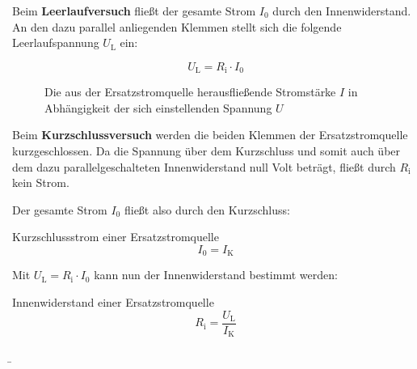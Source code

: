 \begin{frame}
{		Beim \textbf{Leerlaufversuch} fließt der gesamte Strom $I_0$ durch den Innenwiderstand. An den dazu parallel anliegenden
		Klemmen stellt sich die folgende Leerlaufspannung $U_\mathrm{L}$ ein:

		\begin{equation*}
			U_\mathrm{L} = R_\mathrm{i} \cdot I_0
		\end{equation*}


		\begin{figure}[ht]
			\centering


			\caption{Die aus der Ersatzstromquelle herausfließende Stromstärke $I$ in Abhängigkeit der sich einstellenden Spannung $U$}
			\label{fig:kennliniestrom}
		\end{figure}



		Beim \textbf{Kurzschlussversuch} werden die beiden Klemmen der Ersatzstromquelle kurzgeschlossen.
		Da die Spannung über dem Kurzschluss und somit
		auch über dem dazu parallelgeschalteten Innenwiderstand null Volt beträgt, fließt durch
		$R_\mathrm{i}$ kein Strom.

		Der gesamte Strom $I_0$ fließt also durch den Kurzschluss:



		\begin{Merksatz}{Kurzschlussstrom einer Ersatzstromquelle}{}
			\begin{equation*}
				I_0 = I_\mathrm{K}
			\end{equation*}
		\end{Merksatz}




		Mit $U_\mathrm{L} = R_\mathrm{i} \cdot I_0$ kann nun der Innenwiderstand bestimmt werden:

		\begin{Merksatz}{Innenwiderstand einer Ersatzstromquelle}{}
			\begin{equation*}
				R_\mathrm{i} = \frac{U_\mathrm{L}}{I_\mathrm{K}}
			\end{equation*}
		\end{Merksatz}

	}
	\b{

		\begin{columns}



\end{columns}}
\end{frame}
